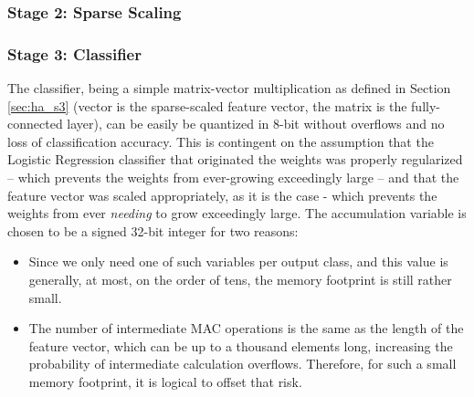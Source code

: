 
        \subsubsection{Stage 2: Sparse Scaling}\label{sec:im_nanohydra_qnt_s2}

        \subsubsection{Stage 3: Classifier}\label{sec:im_nanohydra_qnt_s3}

        The classifier, being a simple matrix-vector multiplication as defined in Section \ref{sec:ha_s3} (vector is the sparse-scaled feature vector, the matrix is the fully-connected layer), can be easily
        be quantized in 8-bit without overflows and no loss of classification accuracy. This is contingent on the assumption that the Logistic Regression classifier that originated the weights was properly 
        regularized -- which prevents the weights from ever-growing exceedingly large -- and that the feature vector was scaled appropriately, as it is the case - which prevents the weights from ever \emph{needing}
        to grow exceedingly large. The accumulation variable is chosen to be a signed 32-bit integer for two reasons:
        
        \begin{itemize}
            \item Since we only need one of such variables per output class, and this value is generally, at most, on the order of tens, the memory footprint is still rather small. 
            \item The number of intermediate MAC operations is the same as the length of the feature vector, which can be up to a thousand elements long, increasing the probability of intermediate calculation
                  overflows. Therefore, for such a small memory footprint, it is logical to offset that risk.
        \end{itemize}

